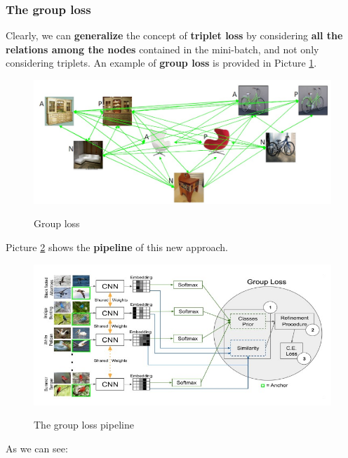 \subsubsection{The group loss}
Clearly, we can \textbf{generalize} the concept of \textbf{triplet loss} by considering \textbf{all the relations among the nodes} contained in the mini-batch, and not only considering triplets. An example of \textbf{group loss} is provided in Picture \ref{camc15}.

\begin{figure}[h!]
    \centering
    \includegraphics[scale = 1.4]{img/camc15.jpg}
    \label{camc15}
    \caption{Group loss}
\end{figure}

Picture \ref{camc16} shows the \textbf{pipeline} of this new approach.

\begin{figure}[h!]
    \centering
    \includegraphics[scale = 1.5]{img/camc16.jpg}
    \label{camc16}
    \caption{The group loss pipeline}
\end{figure}

As we can see:

